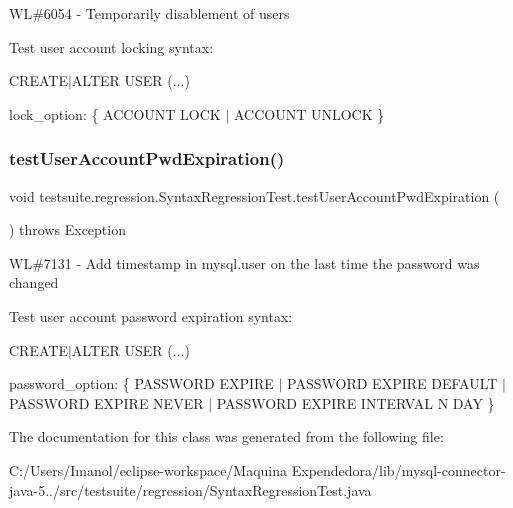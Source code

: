 WL\#6054 -\/ Temporarily disablement of users

Test user account locking syntax\+:

C\+R\+E\+A\+T\+E$\vert$\+A\+L\+T\+ER U\+S\+ER (...)
\begin{DoxyItemize}
\item lock\+\_\+option\+: \{ A\+C\+C\+O\+U\+NT L\+O\+CK $\vert$ A\+C\+C\+O\+U\+NT U\+N\+L\+O\+CK \} 
\end{DoxyItemize}\mbox{\label{classtestsuite_1_1regression_1_1_syntax_regression_test_a3b24b59ae1c99620e5666390a7b80119}} 
\subsubsection{\texorpdfstring{test\+User\+Account\+Pwd\+Expiration()}{testUserAccountPwdExpiration()}}
{\footnotesize\ttfamily void testsuite.\+regression.\+Syntax\+Regression\+Test.\+test\+User\+Account\+Pwd\+Expiration (\begin{DoxyParamCaption}{ }\end{DoxyParamCaption}) throws Exception}

WL\#7131 -\/ Add timestamp in mysql.\+user on the last time the password was changed

Test user account password expiration syntax\+:

C\+R\+E\+A\+T\+E$\vert$\+A\+L\+T\+ER U\+S\+ER (...)
\begin{DoxyItemize}
\item password\+\_\+option\+: \{ P\+A\+S\+S\+W\+O\+RD E\+X\+P\+I\+RE $\vert$ P\+A\+S\+S\+W\+O\+RD E\+X\+P\+I\+RE D\+E\+F\+A\+U\+LT $\vert$ P\+A\+S\+S\+W\+O\+RD E\+X\+P\+I\+RE N\+E\+V\+ER $\vert$ P\+A\+S\+S\+W\+O\+RD E\+X\+P\+I\+RE I\+N\+T\+E\+R\+V\+AL N D\+AY \} 
\end{DoxyItemize}

The documentation for this class was generated from the following file\+:\begin{DoxyCompactItemize}
\item 
C\+:/\+Users/\+Imanol/eclipse-\/workspace/\+Maquina Expendedora/lib/mysql-\/connector-\/java-\/5../src/testsuite/regression/Syntax\+Regression\+Test.\+java\end{DoxyCompactItemize}
